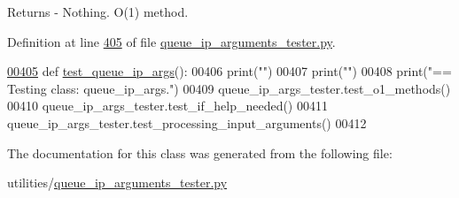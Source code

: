 \begin{DoxyReturn}{Returns}
-\/ Nothing. O(1) method. 
\end{DoxyReturn}


Definition at line \hyperlink{queue__ip__arguments__tester_8py_source_l00405}{405} of file \hyperlink{queue__ip__arguments__tester_8py_source}{queue\+\_\+ip\+\_\+arguments\+\_\+tester.\+py}.


\begin{DoxyCode}
\hypertarget{classutilities_1_1queue__ip__arguments__tester_1_1queue__ip__args__tester_l00405}{}\hyperlink{classutilities_1_1queue__ip__arguments__tester_1_1queue__ip__args__tester_aee90077323d94238d7f81b23e31207c3}{00405}     \textcolor{keyword}{def }\hyperlink{classutilities_1_1queue__ip__arguments__tester_1_1queue__ip__args__tester_aee90077323d94238d7f81b23e31207c3}{test\_queue\_ip\_args}():
00406         print(\textcolor{stringliteral}{""})
00407         print(\textcolor{stringliteral}{""})
00408         print(\textcolor{stringliteral}{"==   Testing class: queue\_ip\_args."})
00409         queue\_ip\_args\_tester.test\_o1\_methods()
00410         queue\_ip\_args\_tester.test\_if\_help\_needed()
00411         queue\_ip\_args\_tester.test\_processing\_input\_arguments()
00412 \end{DoxyCode}


The documentation for this class was generated from the following file\+:\begin{DoxyCompactItemize}
\item 
utilities/\hyperlink{queue__ip__arguments__tester_8py}{queue\+\_\+ip\+\_\+arguments\+\_\+tester.\+py}\end{DoxyCompactItemize}
